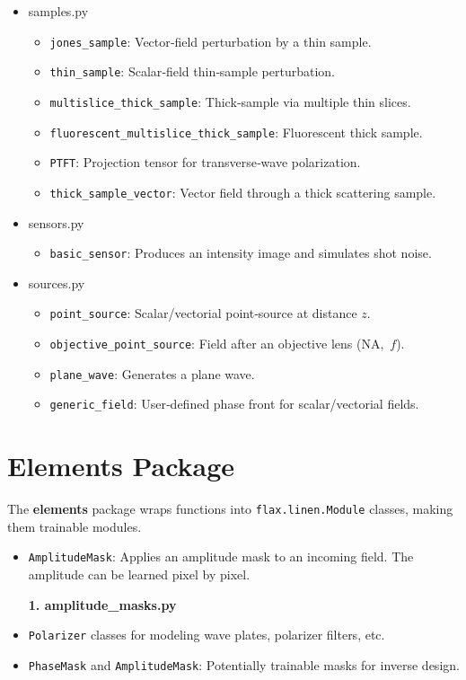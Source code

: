 \documentclass[a4paper,12pt]{report}
\begin{document}
\begin{itemize}[itemsep=1em]
  \item[\large\bfseries 8.\ ] samples.py
    \begin{itemize}[itemsep=0.5em]
      \item \texttt{jones\_sample}: Vector‑field perturbation by a thin sample.
      \item \texttt{thin\_sample}: Scalar‑field thin‑sample perturbation.
      \item \texttt{multislice\_thick\_sample}: Thick‐sample via multiple thin slices.
      \item \texttt{fluorescent\_multislice\_thick\_sample}: Fluorescent thick sample.
      \item \texttt{PTFT}: Projection tensor for transverse‐wave polarization.
      \item \texttt{thick\_sample\_vector}: Vector field through a thick scattering sample.
    \end{itemize}

  \item[\large\bfseries 9.\ ] sensors.py
    \begin{itemize}[itemsep=0.5em]
      \item \texttt{basic\_sensor}: Produces an intensity image and simulates shot noise.
    \end{itemize}

  \item[\large\bfseries 10.\ ] sources.py
    \begin{itemize}[itemsep=0.5em]
      \item \texttt{point\_source}: Scalar/vectorial point‐source at distance \(z\).
      \item \texttt{objective\_point\_source}: Field after an objective lens (NA, \(f\)).
      \item \texttt{plane\_wave}: Generates a plane wave.
      \item \texttt{generic\_field}: User‑defined phase front for scalar/vectorial fields.
    \end{itemize}
\end{itemize}


\section{Elements Package}
The \textbf{elements} package wraps functions into \texttt{flax.linen.Module} classes, making them trainable modules.
\begin{itemize}

    \vspace{1em}
    {\large \textbf{1. amplitude\_masks.py}}
    \item \texttt{AmplitudeMask}: Applies an amplitude mask to an incoming field. The amplitude can be learned pixel by pixel.
    
    \vspace{1em}
    {\large \textbf{1. amplitude\_masks.py}}
    \item \texttt{Polarizer} classes for modeling wave plates, polarizer filters, etc.
    \item \texttt{PhaseMask} and \texttt{AmplitudeMask}: Potentially trainable masks for inverse design.
\end{itemize}
\end{document}
